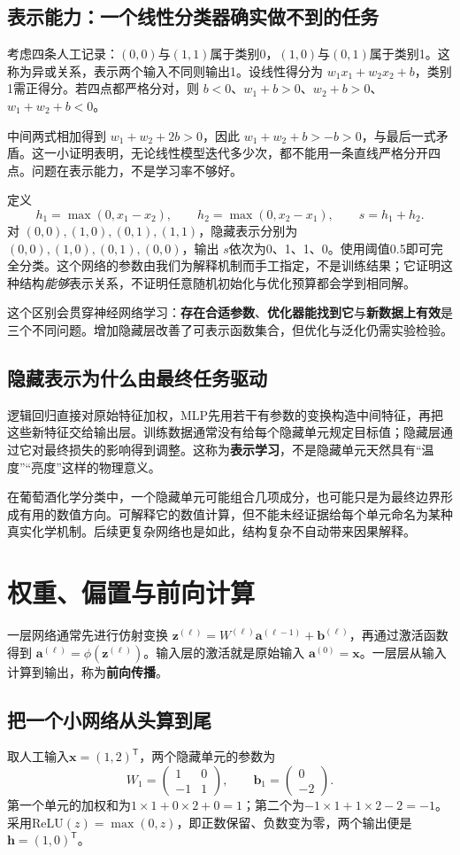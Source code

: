 \subsection{表示能力：一个线性分类器确实做不到的任务}
考虑四条人工记录：$(0,0)$与$(1,1)$属于类别0，$(1,0)$与$(0,1)$属于类别1。这称为异或关系，表示两个输入不同则输出1。设线性得分为 $w_1x_1+w_2x_2+b$，类别1需正得分。若四点都严格分对，则 $b<0$、$w_1+b>0$、$w_2+b>0$、$w_1+w_2+b<0$。

中间两式相加得到 $w_1+w_2+2b>0$，因此 $w_1+w_2+b>-b>0$，与最后一式矛盾。这一小证明表明，无论线性模型迭代多少次，都不能用一条直线严格分开四点。问题在表示能力，不是学习率不够好。

定义
\[
h_1=\max(0,x_1-x_2),\qquad h_2=\max(0,x_2-x_1),\qquad s=h_1+h_2.
\]
对 $(0,0),(1,0),(0,1),(1,1)$，隐藏表示分别为 $(0,0),(1,0),(0,1),(0,0)$，输出 $s$依次为0、1、1、0。使用阈值0.5即可完全分类。这个网络的参数由我们为解释机制而手工指定，不是训练结果；它证明这种结构\emph{能够}表示关系，不证明任意随机初始化与优化预算都会学到相同解。

这个区别会贯穿神经网络学习：\textbf{存在合适参数}、\textbf{优化器能找到它}与\textbf{新数据上有效}是三个不同问题。增加隐藏层改善了可表示函数集合，但优化与泛化仍需实验检验。

\subsection{隐藏表示为什么由最终任务驱动}
逻辑回归直接对原始特征加权，MLP先用若干有参数的变换构造中间特征，再把这些新特征交给输出层。训练数据通常没有给每个隐藏单元规定目标值；隐藏层通过它对最终损失的影响得到调整。这称为\textbf{表示学习}，不是隐藏单元天然具有“温度”“亮度”这样的物理意义。

在葡萄酒化学分类中，一个隐藏单元可能组合几项成分，也可能只是为最终边界形成有用的数值方向。可解释它的数值计算，但不能未经证据给每个单元命名为某种真实化学机制。后续更复杂网络也是如此，结构复杂不自动带来因果解释。

\section{权重、偏置与前向计算}
一层网络通常先进行仿射变换 $\mathbf z^{(\ell)}=W^{(\ell)}\mathbf a^{(\ell-1)}+\mathbf b^{(\ell)}$，再通过激活函数得到 $\mathbf a^{(\ell)}=\phi(\mathbf z^{(\ell)})$。输入层的激活就是原始输入 $\mathbf a^{(0)}=\mathbf x$。一层层从输入计算到输出，称为\textbf{前向传播}。

\subsection*{把一个小网络从头算到尾}
取人工输入$\mathbf x=(1,2)^{\mathsf T}$，两个隐藏单元的参数为
\[
W_1=\begin{pmatrix}1&0\\-1&1\end{pmatrix},\qquad
\mathbf b_1=\begin{pmatrix}0\\-2\end{pmatrix}.
\]
第一个单元的加权和为$1\times1+0\times2+0=1$；第二个为$-1\times1+1\times2-2=-1$。采用$\mathrm{ReLU}(z)=\max(0,z)$，即正数保留、负数变为零，两个输出便是$\mathbf h=(1,0)^{\mathsf T}$。

